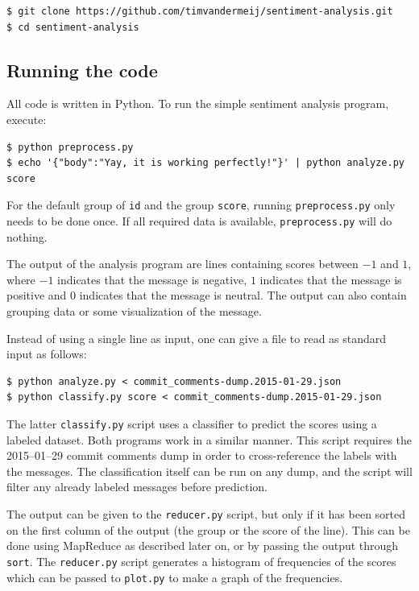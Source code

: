 \documentclass{article}
\begin{document}
\begin{verbatim}
$ git clone https://github.com/timvandermeij/sentiment-analysis.git
$ cd sentiment-analysis
\end{verbatim}

\subsection{Running the code}\label{app:running-the-code}
All code is written in Python. To run the simple sentiment analysis program, execute:

\begin{verbatim}
$ python preprocess.py
$ echo '{"body":"Yay, it is working perfectly!"}' | python analyze.py score
\end{verbatim}

For the default group of \texttt{id} and the group \texttt{score}, running
\texttt{preprocess.py} only needs to be done once. If all required data is
available, \texttt{preprocess.py} will do nothing.

The output of the analysis program are lines containing scores between $-1$ and 
$1$, where $-1$ indicates that the message is negative, $1$ indicates that the 
message is positive and $0$ indicates that the message is neutral. The output 
can also contain grouping data or some visualization of the message.

Instead of using a single line as input, one can give a file to read as standard
input as follows:

\begin{verbatim}
$ python analyze.py < commit_comments-dump.2015-01-29.json
$ python classify.py score < commit_comments-dump.2015-01-29.json
\end{verbatim}

The latter \texttt{classify.py} script uses a classifier to predict the scores 
using a labeled dataset. Both programs work in a similar manner. This script 
requires the 2015--01--29 commit comments dump in order to 
cross-reference the labels with the messages. The classification itself can be 
run on any dump, and the script will filter any already labeled messages before 
prediction.

The output can be given to the \texttt{reducer.py} script, but only if it has 
been sorted on the first column of the output (the group or the score of the 
line). This can be done using MapReduce as described later on, or by passing 
the output through \texttt{sort}. The \texttt{reducer.py} script generates 
a histogram of frequencies of the scores which can be passed to 
\texttt{plot.py} to make a graph of the frequencies.
\end{document}
